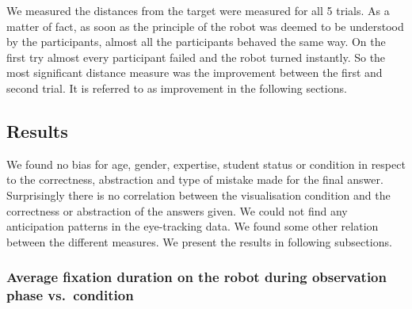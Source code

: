 \documentclass{sig-alternate}
\begin{document}
We measured the distances from the target were measured for all 5 trials. As
a matter of fact, as soon as the principle of the robot was deemed to be
understood by the participants, almost all the participants behaved the
same way. On the first try almost every participant failed and the robot
turned instantly. So the most significant distance measure was the
improvement between the first and second trial. It is referred to as
improvement in the following sections.

%
%
%
%
%


\subsection{Results}

We found no bias for age, gender, expertise, student status or condition
in respect to the correctness, abstraction and type of mistake made for
the final answer. Surprisingly there is no correlation between the
visualisation condition and the correctness or abstraction of the
answers given. We could not find any anticipation patterns in the
eye-tracking data. We found some other relation between the different
measures. We present the results in following subsections.

\subsubsection{Average fixation duration on the robot during observation phase
vs.~condition}
\end{document}
